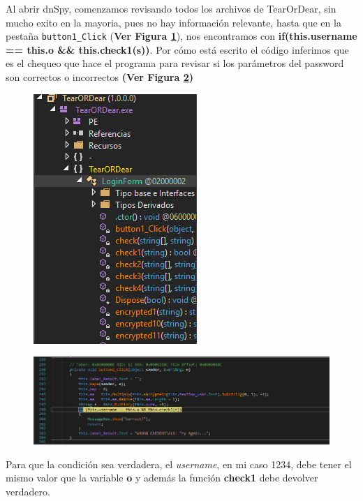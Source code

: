 \documentclass[letterpaper,10pt]{article}
\begin{document}
Al abrir dnSpy, comenzamos revisando todos los archivos de TearOrDear, sin mucho exito en la mayoria, pues no hay información relevante, hasta que en la pestaña \texttt{button1\_Click} (\textbf{Ver Figura \ref{fig:button}}), nos encontramos con \textbf{if(this.username == this.o \&\& this.check1(s))}. Por cómo está escrito el código inferimos que es el chequeo que hace el programa para revisar si los parámetros del password son correctos o incorrectos \textbf{(Ver Figura \ref{fig:user})}

\begin{figure}[h]
  \centering
  \includegraphics[scale=0.9]{images/tearordear/button}
  \label{fig:button}
\end{figure} 

\begin{figure}[h]
  \centering
  \includegraphics[scale=0.75]{images/tearordear/user}
  \label{fig:user}
\end{figure}
\newpage

Para que la condición sea verdadera, el \textit{username}, en mi caso 1234, debe tener el mismo valor que la variable \textbf{o} y además la función \textbf{check1} debe devolver verdadero.
\end{document}
